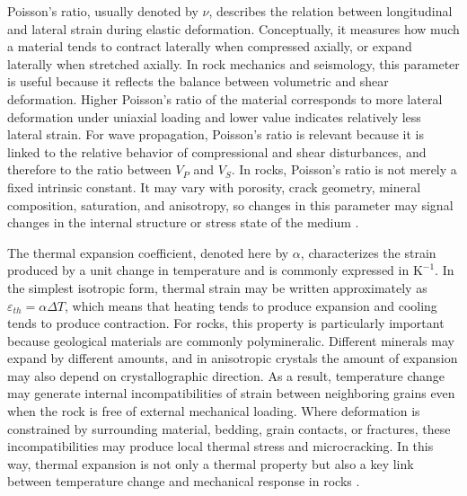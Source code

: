 Poisson's ratio, usually denoted by $\nu$, describes the relation between longitudinal and lateral strain during elastic deformation. Conceptually, it measures how much a material tends to contract laterally when compressed axially, or expand laterally when stretched axially. In rock mechanics and seismology, this parameter is useful because it reflects the balance between volumetric and shear deformation. Higher Poisson’s ratio of the material corresponds to more lateral deformation under uniaxial loading and lower value indicates relatively less lateral strain. For wave propagation, Poisson's ratio is relevant because it is linked to the relative behavior of compressional and shear disturbances, and therefore to the ratio between $V_P$ and $V_S$. In rocks, Poisson's ratio is not merely a fixed intrinsic constant. It may vary with porosity, crack geometry, mineral composition, saturation, and anisotropy, so changes in this parameter may signal changes in the internal structure or stress state of the medium \cite{mavko2009,jaeger2007,aki2002}. %

The thermal expansion coefficient, denoted here by $\alpha$, characterizes the strain produced by a unit change in temperature and is commonly expressed in $\mathrm{K^{-1}}$. In the simplest isotropic form, thermal strain may be written approximately as $\varepsilon_{th}=\alpha \Delta T$, which means that heating tends to produce expansion and cooling tends to produce contraction. For rocks, this property is particularly important because geological materials are commonly polymineralic. Different minerals may expand by different amounts, and in anisotropic crystals the amount of expansion may also depend on crystallographic direction. As a result, temperature change may generate internal incompatibilities of strain between neighboring grains even when the rock is free of external mechanical loading. Where deformation is constrained by surrounding material, bedding, grain contacts, or fractures, these incompatibilities may produce local thermal stress and microcracking. In this way, thermal expansion is not only a thermal property but also a key link between temperature change and mechanical response in rocks \cite{robertson1988,jaeger2007}. %

